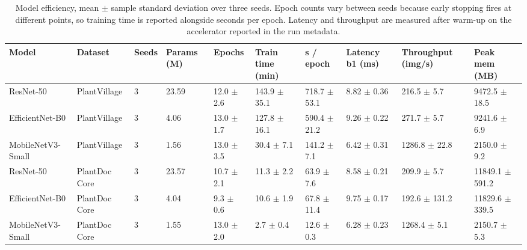 \begin{table}[htbp]
\caption{Model efficiency, mean $\pm$ sample standard deviation over three seeds. Epoch counts vary between seeds because early stopping fires at different points, so training time is reported alongside seconds per epoch. Latency and throughput are measured after warm-up on the accelerator reported in the run metadata.}
\label{tab:efficiency}
\tiny
\centering
\setlength{\tabcolsep}{3pt}
\begin{tabular}{llllllllll}
\toprule
Model & Dataset & Seeds & Params (M) & Epochs & Train time (min) & s / epoch & Latency b1 (ms) & Throughput (img/s) & Peak mem (MB) \\
\midrule
ResNet-50 & PlantVillage & 3 & 23.59 & 12.0 $\pm$ 2.6 & 143.9 $\pm$ 35.1 & 718.7 $\pm$ 53.1 & 8.82 $\pm$ 0.36 & 216.5 $\pm$ 5.7 & 9472.5 $\pm$ 18.5 \\
EfficientNet-B0 & PlantVillage & 3 & 4.06 & 13.0 $\pm$ 1.7 & 127.8 $\pm$ 16.1 & 590.4 $\pm$ 21.2 & 9.26 $\pm$ 0.22 & 271.7 $\pm$ 5.7 & 9241.6 $\pm$ 6.9 \\
MobileNetV3-Small & PlantVillage & 3 & 1.56 & 13.0 $\pm$ 3.5 & 30.4 $\pm$ 7.1 & 141.2 $\pm$ 7.1 & 6.42 $\pm$ 0.31 & 1286.8 $\pm$ 22.8 & 2150.0 $\pm$ 9.2 \\
ResNet-50 & PlantDoc Core & 3 & 23.57 & 10.7 $\pm$ 2.1 & 11.3 $\pm$ 2.2 & 63.9 $\pm$ 7.6 & 8.58 $\pm$ 0.21 & 209.9 $\pm$ 5.7 & 11849.1 $\pm$ 591.2 \\
EfficientNet-B0 & PlantDoc Core & 3 & 4.04 & 9.3 $\pm$ 0.6 & 10.6 $\pm$ 1.9 & 67.8 $\pm$ 11.4 & 9.75 $\pm$ 0.17 & 192.6 $\pm$ 131.2 & 11829.6 $\pm$ 339.5 \\
MobileNetV3-Small & PlantDoc Core & 3 & 1.55 & 13.0 $\pm$ 2.0 & 2.7 $\pm$ 0.4 & 12.6 $\pm$ 0.3 & 6.28 $\pm$ 0.23 & 1268.4 $\pm$ 5.1 & 2150.7 $\pm$ 5.3 \\
\bottomrule
\end{tabular}
\end{table}
